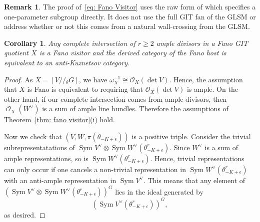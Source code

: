 \documentclass[reqno, 12pt]{amsart}
\newtheorem{corollary}[theorem]{Corollary}
\theoremstyle{definition}
\newtheorem{remark}[theorem]{Remark}
\newcommand{\op}[1]{\operatorname{#1}}
\newcommand{\modmod}[1]{/ \! \! / \!_{#1}}
\newcommand{\dbcoh}[1]{\operatorname{D}^{\operatorname{b}}(\operatorname{coh }#1)}
\newcommand{\dabs}{\op{D}^{\op{abs}}}
\def\O{\op{\mathcal{O}}}
\def\rank{\text{rk}}
\numberwithin{equation}{section}
\begin{document}
%

\begin{remark}
    The proof of~\eqref{eq: Fano Visitor} uses the raw form of \cite[Theorem 3.5.2]{VGIT} which specifies a one-parameter subgroup directly.  It does not use the full GIT fan of the GLSM or address whether or not this comes from a natural wall-crossing from the GLSM. 
\end{remark}

\begin{corollary} \label{cor: xmas miracle}
Any complete intersection of $r\ge 2$ ample divisors in a Fano GIT quotient $X$ is a Fano visitor and the derived category of the Fano host is equivalent to an anti-Kuznetsov category.
\end{corollary}

\begin{proof}
As $X = [V \modmod{\theta}G]$, we have $\omega^{-1}_X \cong \mathcal O_X(\det V)$.  Hence, the assumption that $X$ is Fano is equivalent to requiring that $\mathcal O_X(\det V)$ is ample.  On the other hand, if our complete intersection comes from ample divisors, then $\O_X(W^\vee)$ is a sum of ample line bundles.  Therefore the assumptions of Theorem~\ref{thm: fano visitor}(i) hold.  

Now we check that $(V,W, \pi(\theta_{-K+ \epsilon}))$ is a positive triple.   Consider the trivial subrepresentatations of $\op{Sym }V^\vee \otimes \op{Sym }W^\vee(\theta_{-K+\epsilon}^r)$.  Since $W^\vee$ is a sum of ample representations, so is $\op{Sym }W^\vee(\theta_{-K+\epsilon}^r)$.  Hence, trivial representations can only occur if one cancels a non-trivial representation in $\op{Sym }W^\vee(\theta_{-K+\epsilon}^r)$ with an anti-ample representation in 
$\op{Sym }V^\vee$. This means that any element of $(\op{Sym }V^\vee \otimes \op{Sym }W^\vee(\theta_{-K+\epsilon}^r))^G$ lies in the ideal generated by $$(\op{Sym }V^\vee(\theta_{-K+\epsilon}^r))^G,$$ as desired.
\end{proof}
\end{document}
